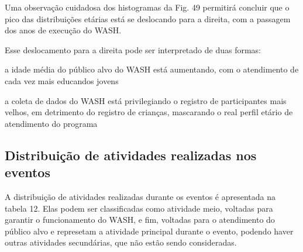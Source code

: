 \documentclass[
12pt,		%
openright,	%
twoside,  %
a4paper,			%
chapter=TITLE,		%
english,			%
french,				%
spanish,			%
brazil				%
]{USPSC-classe/USPSC}
\begin{document}
Uma observa\c{c}\~ao cuidadosa dos histogramas da Fig. 49 permitir\'a concluir que o pico das distribui\c{c}\~oes et\'arias est\'a se deslocando para a direita, com a passagem dos anos de execu\c{c}\~ao do WASH.








Esse deslocamento para a direita pode ser interpretado de duas formas:









\begin{alineas}
\item a idade m\'edia do p\'ublico alvo do WASH est\'a aumentando, com o atendimento de cada vez mais educandos jovens
\item a coleta de dados do WASH est\'a privilegiando o registro de participantes mais velhos, em detrimento do registro de crian\c{c}as, mascarando o real perfil et\'ario de atendimento do programa
\end{alineas}

\subsection[Distribui\c{c}\~ao de atividades realizadas nos eventos]{Distribui\c{c}\~ao de atividades realizadas nos eventos}\label{Distribui\c{c}\~ao de atividades realizadas nos eventos}
A distribui\c{c}\~ao de atividades realizadas durante os eventos \'e apresentada na tabela 12. Elas podem ser classificadas como \textquotedbl atividade meio\textquotedbl , voltadas para garantir o funcionamento do WASH, e \textquotedbl fim\textquotedbl , voltadas para o atendimento do p\'ublico alvo e represetam a atividade principal durante o evento, podendo haver outras atividades secund\'arias, que n\~ao est\~ao sendo consideradas.
\end{document}
